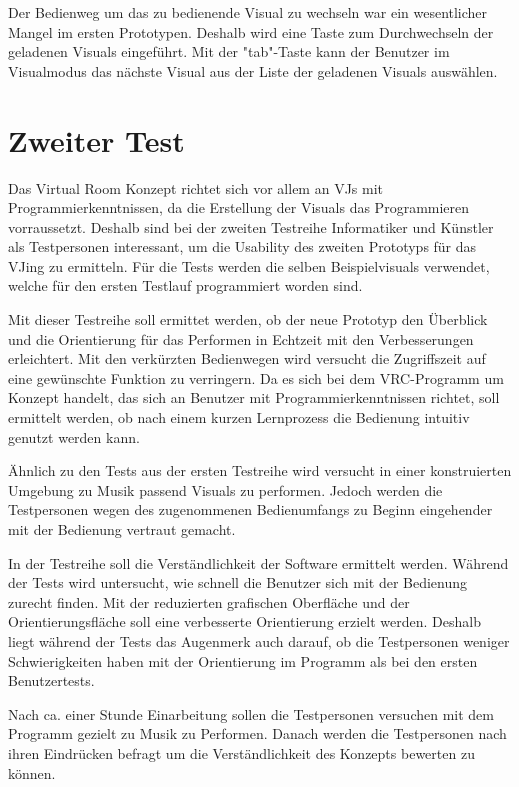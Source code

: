 Der Bedienweg um das zu bedienende Visual zu wechseln war ein wesentlicher Mangel im ersten Prototypen. Deshalb wird eine Taste zum
Durchwechseln der geladenen Visuals eingef\"uhrt. Mit der "tab"-Taste kann der Benutzer im Visualmodus das n\"achste Visual aus der Liste der
geladenen Visuals ausw\"ahlen.

\section{Zweiter Test}

Das Virtual Room Konzept richtet sich vor allem an VJs mit Programmierkenntnissen, da die Erstellung der Visuals das Programmieren vorraussetzt.
Deshalb sind bei der zweiten Testreihe Informatiker und K\"unstler als Testpersonen interessant, um die Usability des zweiten Prototyps f\"ur das VJing zu ermitteln.
F\"ur die Tests werden die selben Beispielvisuals verwendet, welche f\"ur den ersten Testlauf programmiert worden sind.

Mit dieser Testreihe soll ermittet werden, ob der neue Prototyp den \"Uberblick und die Orientierung f\"ur das Performen in Echtzeit
mit den Verbesserungen erleichtert. Mit den verk\"urzten Bedienwegen wird versucht die Zugriffszeit auf eine gew\"unschte Funktion zu verringern.
Da es sich bei dem VRC-Programm um Konzept handelt, das sich an Benutzer mit Programmierkenntnissen richtet, soll ermittelt werden, ob nach
einem kurzen Lernprozess die Bedienung intuitiv genutzt werden kann.

\"Ahnlich zu den Tests aus der ersten Testreihe wird versucht in einer konstruierten Umgebung zu Musik passend Visuals zu performen.
Jedoch werden die Testpersonen wegen des zugenommenen Bedienumfangs zu Beginn eingehender mit der Bedienung vertraut gemacht.

In der Testreihe soll die Verst\"andlichkeit der Software ermittelt werden. W\"ahrend der Tests wird untersucht, wie schnell die Benutzer
sich mit der Bedienung zurecht finden. Mit der reduzierten grafischen Oberfl\"ache und der Orientierungsfl\"ache soll eine verbesserte
Orientierung erzielt werden. Deshalb liegt w\"ahrend der Tests das Augenmerk auch darauf, ob die Testpersonen weniger Schwierigkeiten
haben mit der Orientierung im Programm als bei den ersten Benutzertests.

Nach ca. einer Stunde Einarbeitung sollen die Testpersonen versuchen mit dem Programm gezielt zu Musik zu Performen. Danach werden die
Testpersonen nach ihren Eindr\"ucken befragt um die Verst\"andlichkeit des Konzepts bewerten zu k\"onnen.

